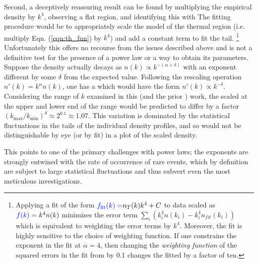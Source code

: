 	Second, a deceptively reassuring result can be found by multiplying the empirical density by $k^4$, observing a flat region, and identifying this with  %
	The fitting procedure would be to appropriately scale the model of the thermal region (i.e. multiply Eqn. (\ref{eqn:th_fun}) by $k^4$) and add a constant term to fit the tail.
	\footnote{Applying a fit of the form ${\color{blue}{f_{\rm fit}(k)=}}n_T(k)k^4+C$ to data scaled as ${\color{blue}{f(k)}} = k^4 n(k)$ minimizes the error term $\sum_i (k_{i}^{4}n(k_i)-k_{i}^4n_{fit}(k_i))$ which is equivalent to weighting the error terms  by $k^4$. 
	Moreover, the fit is highly sensitive to the choice of weighting function.
	If one constrains the exponent in the fit  at $\alpha=4$, then changing the  \emph{weighting function} of the squared errors in the fit from  by 0.1  changes the fitted  %
	by a factor of ten.}
	Unfortunately this offers no recourse from the issues described above and is not a definitive test for the presence of a power law or a way to obtain its parameters.
	Suppose the density actually decays as $n(k) \propto k^{-(\alpha+\delta)}$ with an exponent different by some $\delta$ from the expected value.
	Following the rescaling operation $n'(k) = k^\alpha n(k)$, one has a  %
	which would have the form $n'(k) \propto k^{-\delta}$. 
	Considering the range of $k$ examined in this (and the prior \cite{Chang16}) work, the scaled  %
	at the upper and lower end of the range would be predicted to differ by a factor $(k_\textrm{max}/k_\textrm{min})^\delta \approx 2^{0.1}\approx1.07$.
	This variation is dominated by the statistical fluctuations in the tails of the individual density profiles, and so would not be distinguishable by eye (or by fit) in a plot of the scaled density.
	
	This points to one of the primary challenges with power laws; the exponents are strongly entwined with the rate of occurrence of rare events, which by definition are subject to large statistical fluctuations and thus subvert even the most meticulous investigations.


